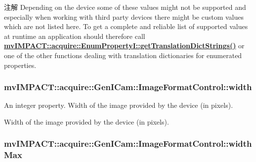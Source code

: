 \begin{DoxyNote}{注解}
Depending on the device some of these values might not be supported and especially when working with third party devices there might be custom values which are not listed here. To get a complete and reliable list of supported values at runtime an application should therefore call {\bfseries \hyperlink{classmv_i_m_p_a_c_t_1_1acquire_1_1_enum_property_i_a0ba6ccbf5ee69784d5d0b537924d26b6}{mv\+I\+M\+P\+A\+C\+T\+::acquire\+::\+Enum\+Property\+I\+::get\+Translation\+Dict\+Strings()}} or one of the other functions dealing with translation dictionaries for enumerated properties. 
\end{DoxyNote}
\hypertarget{classmv_i_m_p_a_c_t_1_1acquire_1_1_gen_i_cam_1_1_image_format_control_a26c77884743e27837dda64cc08d9266c}{
\subsubsection[{width}]{ mv\+I\+M\+P\+A\+C\+T\+::acquire\+::\+Gen\+I\+Cam\+::\+Image\+Format\+Control\+::width}}\label{classmv_i_m_p_a_c_t_1_1acquire_1_1_gen_i_cam_1_1_image_format_control_a26c77884743e27837dda64cc08d9266c}


An integer property. Width of the image provided by the device (in pixels). 

Width of the image provided by the device (in pixels). \hypertarget{classmv_i_m_p_a_c_t_1_1acquire_1_1_gen_i_cam_1_1_image_format_control_a2c55b3c587d1938aaed00089b322114c}{
\subsubsection[{width\+Max}]{ mv\+I\+M\+P\+A\+C\+T\+::acquire\+::\+Gen\+I\+Cam\+::\+Image\+Format\+Control\+::width\+Max}}\label{classmv_i_m_p_a_c_t_1_1acquire_1_1_gen_i_cam_1_1_image_format_control_a2c55b3c587d1938aaed00089b322114c}


